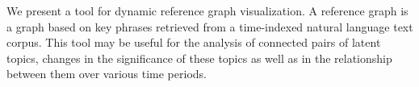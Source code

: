 We present a tool for dynamic reference graph visualization. A reference graph is a graph based on key phrases retrieved from a time-indexed natural language text corpus. This tool may be useful for the analysis of connected pairs of latent topics, changes in the significance of these topics as well as in the relationship between them over various time periods.
